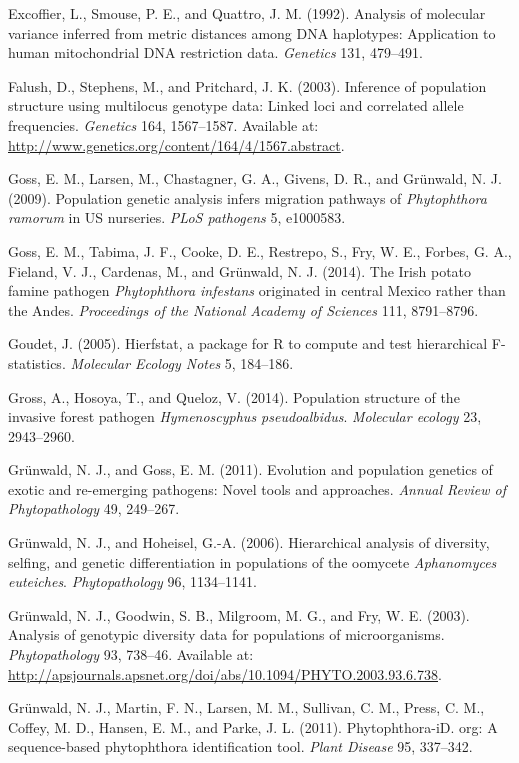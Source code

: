 \documentclass{frontiersSCNS} %
\begin{document}
Excoffier, L., Smouse, P. E., and Quattro, J. M. (1992). Analysis of
molecular variance inferred from metric distances among DNA haplotypes:
Application to human mitochondrial DNA restriction data. \emph{Genetics}
131, 479--491.

Falush, D., Stephens, M., and Pritchard, J. K. (2003). Inference of
population structure using multilocus genotype data: Linked loci and
correlated allele frequencies. \emph{Genetics} 164, 1567--1587.
Available at: \url{http://www.genetics.org/content/164/4/1567.abstract}.

Goss, E. M., Larsen, M., Chastagner, G. A., Givens, D. R., and
Gr{ü}nwald, N. J. (2009). Population genetic analysis infers migration
pathways of \emph{Phytophthora ramorum} in US nurseries. \emph{PLoS
pathogens} 5, e1000583.

Goss, E. M., Tabima, J. F., Cooke, D. E., Restrepo, S., Fry, W. E.,
Forbes, G. A., Fieland, V. J., Cardenas, M., and Gr{ü}nwald, N. J.
(2014). The Irish potato famine pathogen \emph{Phytophthora infestans}
originated in central Mexico rather than the Andes. \emph{Proceedings of
the National Academy of Sciences} 111, 8791--8796.

Goudet, J. (2005). Hierfstat, a package for R to compute and test
hierarchical F-statistics. \emph{Molecular Ecology Notes} 5, 184--186.

Gross, A., Hosoya, T., and Queloz, V. (2014). Population structure of
the invasive forest pathogen \emph{Hymenoscyphus pseudoalbidus}.
\emph{Molecular ecology} 23, 2943--2960.

Grünwald, N. J., and Goss, E. M. (2011). Evolution and population
genetics of exotic and re-emerging pathogens: Novel tools and
approaches. \emph{Annual Review of Phytopathology} 49, 249--267.

Gr{ü}nwald, N. J., and Hoheisel, G.-A. (2006). Hierarchical analysis of
diversity, selfing, and genetic differentiation in populations of the
oomycete \emph{Aphanomyces euteiches}. \emph{Phytopathology} 96,
1134--1141.

Grünwald, N. J., Goodwin, S. B., Milgroom, M. G., and Fry, W. E. (2003).
Analysis of genotypic diversity data for populations of microorganisms.
\emph{Phytopathology} 93, 738--46. Available at:
\url{http://apsjournals.apsnet.org/doi/abs/10.1094/PHYTO.2003.93.6.738}.

Gr{ü}nwald, N. J., Martin, F. N., Larsen, M. M., Sullivan, C. M., Press,
C. M., Coffey, M. D., Hansen, E. M., and Parke, J. L. (2011).
Phytophthora-iD. org: A sequence-based phytophthora identification tool.
\emph{Plant Disease} 95, 337--342.
\end{document}
